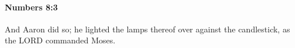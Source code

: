 
		\paragraph{Numbers 8:3} %
			\label{NUMBERS-8-3}

			And Aaron did so; he lighted the lamps thereof over against the candlestick, as the LORD commanded Moses.


